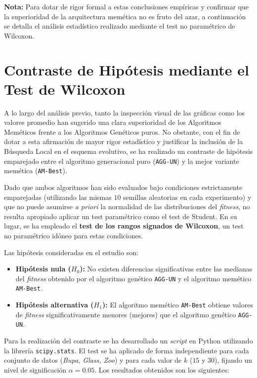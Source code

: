 \documentclass[a4paper,12pt]{article}%
\begin{document}
\vspace{0.4cm}
\noindent \textbf{Nota:} Para dotar de rigor formal a estas conclusiones empíricas y confirmar que la superioridad de la arquitectura memética no es fruto del azar, a continuación se detalla el análisis estadístico realizado mediante el test no paramétrico de Wilcoxon.

\newpage
\section{Contraste de Hipótesis mediante el Test de Wilcoxon}

\noindent A lo largo del análisis previo, tanto la inspección visual de las gráficas como los valores promedio han sugerido una clara superioridad de los Algoritmos Meméticos frente a los Algoritmos Genéticos puros. No obstante, con el fin de dotar a esta afirmación de mayor rigor estadístico y justificar la inclusión de la Búsqueda Local en el esquema evolutivo, se ha realizado un contraste de hipótesis emparejado entre el algoritmo generacional puro (\texttt{AGG-UN}) y la mejor variante memética (\texttt{AM-Best}).

Dado que ambos algoritmos han sido evaluados bajo condiciones estrictamente emparejadas (utilizando las mismas $10$ semillas aleatorias en cada experimento) y que no puede asumirse \textit{a priori} la normalidad de las distribuciones del \textit{fitness}, no resulta apropiado aplicar un test paramétrico como el test de Student. En su lugar, se ha empleado el \textbf{test de los rangos signados de Wilcoxon}, un test no paramétrico idóneo para estas condiciones.

Las hipótesis consideradas en el estudio son:
\begin{itemize}
	\item \textbf{Hipótesis nula ($H_0$):} No existen diferencias significativas entre las medianas del \textit{fitness} obtenido por el algoritmo genético \texttt{AGG-UN} y el algoritmo memético \texttt{AM-Best}.
	\item \textbf{Hipótesis alternativa ($H_1$):} El algoritmo memético \texttt{AM-Best} obtiene valores de \textit{fitness} significativamente menores (mejores) que el algoritmo genético \texttt{AGG-UN}.
\end{itemize}

Para la realización del contraste se ha desarrollado un \textit{script} en Python utilizando la librería \texttt{scipy.stats}. El test se ha aplicado de forma independiente para cada conjunto de datos (\textit{Bupa, Glass, Zoo}) y para cada valor de $k$ ($15$ y $30$), fijando un nivel de significación $\alpha = 0.05$. Los resultados obtenidos son los siguientes:
\end{document}
